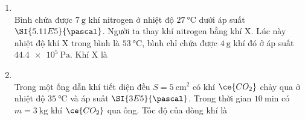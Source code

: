 \begin{enumerate}[label=\bfseries Câu \arabic*:, leftmargin=1.7cm]
\item {}\\
Bình chứa được $\SI{7}{\gram}$ khí nitrogen ở nhiệt độ $\SI{27}{\celsius}$ dưới áp suất $\SI{5.11E5}{\pascal}$. Người ta thay khí nitrogen bằng khí X. Lúc này nhiệt độ khí X trong bình là $\SI{53}{\celsius}$, bình chỉ chứa được $\SI{4}{\gram}$ khí đó ở áp suất $\SI{44.4e5}{\pascal}$. Khí X là 

\item {}\\
Trong một ống dẫn khí tiết diện đều $S=\SI{5}{\centi\meter^2}$ có khí $\ce{CO_2}$ chảy qua ở nhiệt độ $\SI{35}{\celsius}$ và áp suất $\SI{3E5}{\pascal}$. Trong thời gian $\SI{10}{\minute}$ có $m=\SI{3}{\kilogram}$ khí $\ce{CO_2}$ qua ống. Tốc độ của dòng khí là


\end{enumerate}
